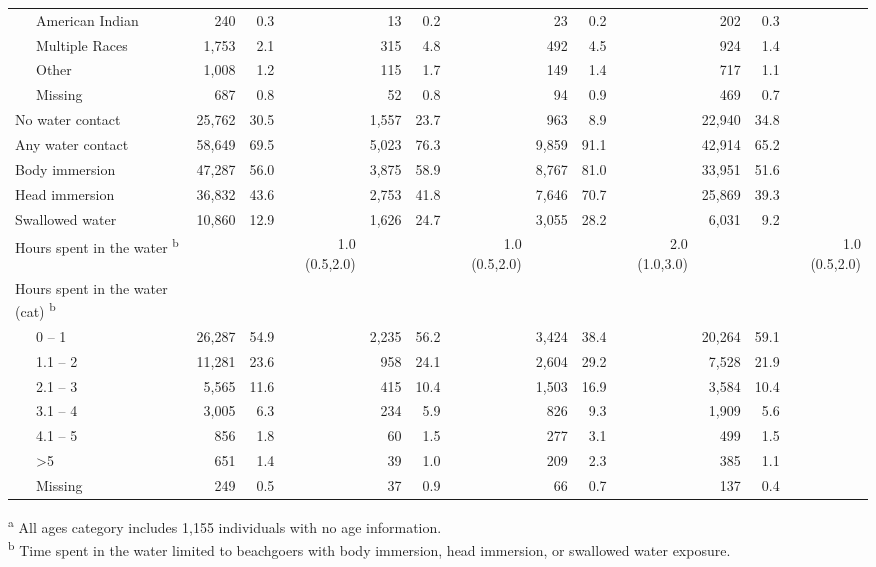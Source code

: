 \documentclass[12pt]{article}\usepackage[]{graphicx}\usepackage[]{color}
\begin{document}
\begin{landscape}
\begin{table}[h!tb]
\begin{center}
\begin{scriptsize}
\begin{tabular}{l rrr rrr rrr rrr}
  ~~~American Indian &    240 & 0.3 &  &    13 & 0.2 &  &     23 & 0.2 &  &    202 & 0.3 &  \\ 
  ~~~Multiple Races &  1,753 & 2.1 &  &   315 & 4.8 &  &    492 & 4.5 &  &    924 & 1.4 &  \\ 
  ~~~Other &  1,008 & 1.2 &  &   115 & 1.7 &  &    149 & 1.4 &  &    717 & 1.1 &  \\ 
  ~~~Missing &    687 & 0.8 &  &    52 & 0.8 &  &     94 & 0.9 &  &    469 & 0.7 &  \\ 
  No water contact & 25,762 & 30.5 &  & 1,557 & 23.7 &  &    963 & 8.9 &  & 22,940 & 34.8 &  \\ 
  Any water contact & 58,649 & 69.5 &  & 5,023 & 76.3 &  &  9,859 & 91.1 &  & 42,914 & 65.2 &  \\ 
  Body immersion & 47,287 & 56.0 &  & 3,875 & 58.9 &  &  8,767 & 81.0 &  & 33,951 & 51.6 &  \\ 
  Head immersion & 36,832 & 43.6 &  & 2,753 & 41.8 &  &  7,646 & 70.7 &  & 25,869 & 39.3 &  \\ 
  Swallowed water & 10,860 & 12.9 &  & 1,626 & 24.7 &  &  3,055 & 28.2 &  &  6,031 & 9.2 &  \\ 
  Hours spent in the water \textsuperscript{b} &  &  & 1.0 (0.5,2.0) &  &  & 1.0 (0.5,2.0) &  &  & 2.0 (1.0,3.0) &  &  & 1.0 (0.5,2.0) \\ 
  Hours spent in the water (cat) \textsuperscript{b} &  &  &  &  &  &  &  &  &  &  &  &  \\ 
  ~~~0 -- 1 & 26,287 & 54.9 &  & 2,235 & 56.2 &  &  3,424 & 38.4 &  & 20,264 & 59.1 &  \\ 
  ~~~1.1 -- 2 & 11,281 & 23.6 &  &   958 & 24.1 &  &  2,604 & 29.2 &  &  7,528 & 21.9 &  \\ 
  ~~~2.1 -- 3 &  5,565 & 11.6 &  &   415 & 10.4 &  &  1,503 & 16.9 &  &  3,584 & 10.4 &  \\ 
  ~~~3.1 -- 4 &  3,005 & 6.3 &  &   234 & 5.9 &  &    826 & 9.3 &  &  1,909 & 5.6 &  \\ 
  ~~~4.1 -- 5 &    856 & 1.8 &  &    60 & 1.5 &  &    277 & 3.1 &  &    499 & 1.5 &  \\ 
  ~~~>5 &    651 & 1.4 &  &    39 & 1.0 &  &    209 & 2.3 &  &    385 & 1.1 &  \\ 
  ~~~Missing &    249 & 0.5 &  &    37 & 0.9 &  &     66 & 0.7 &  &    137 & 0.4 &  \\ 
  
\hline
\end{tabular}
\end{scriptsize}
\end{center}
\begin{scriptsize}
\medskip
\textsuperscript{a} All ages category includes 1,155 individuals with no age information. \\
\textsuperscript{b} Time spent in the water limited to beachgoers with body immersion, head immersion, or swallowed water exposure.
\end{scriptsize}
\end{table}
\end{landscape}
\end{document}
